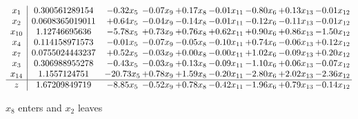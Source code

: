 \documentclass[8pt]{article}
\begin{document}
 \[\begin{array}{c| c c@{\hskip 2pt} c@{\hskip 2pt} c@{\hskip 2pt} c@{\hskip 2pt} c@{\hskip 2pt} c@{\hskip 2pt} c@{\hskip 2pt} }
 x_{1}   &  0.300561289154 & -0.32 x_{5} & -0.07 x_{9} & +  0.17 x_{8} & -0.01 x_{11} & -0.80 x_{6} & +  0.13 x_{13} & -0.01 x_{12}\\
 x_{2}   &  0.0608365019011 & +  0.64 x_{5} & -0.04 x_{9} & -0.14 x_{8} & -0.01 x_{11} & -0.12 x_{6} & -0.11 x_{13} & -0.01 x_{12}\\
 x_{10}   &  1.12746695636 & -5.78 x_{5} & +  0.73 x_{9} & +  0.76 x_{8} & +  0.62 x_{11} & +  0.90 x_{6} & +  0.86 x_{13} & -1.50 x_{12}\\
 x_{4}   &  0.114158971573 & -0.01 x_{5} & -0.07 x_{9} & -0.05 x_{8} & -0.10 x_{11} & +  0.74 x_{6} & -0.06 x_{13} & +  0.12 x_{12}\\
 x_{7}   &  0.0755024443237 & +  0.52 x_{5} & -0.03 x_{9} & +  0.00 x_{8} & -0.00 x_{11} & +  1.02 x_{6} & -0.09 x_{13} & +  0.20 x_{12}\\
 x_{3}   &  0.306988955278 & -0.43 x_{5} & -0.03 x_{9} & +  0.13 x_{8} & -0.09 x_{11} & -1.10 x_{6} & +  0.06 x_{13} & -0.07 x_{12}\\
 x_{14}   &  1.1557124751 & -20.73 x_{5} & +  0.78 x_{9} & +  1.59 x_{8} & -0.20 x_{11} & -2.80 x_{6} & +  2.02 x_{13} & -2.36 x_{12}\\
\hline
z    &  1.67209849719 & -8.85 x_{5} & -0.52 x_{9} & +  0.78 x_{8} & -0.42 x_{11} & -1.96 x_{6} & +  0.79 x_{13} & -0.14 x_{12}\\
\end{array}\]


 $ x_{8} $ enters and $ x_{2} $ leaves 
\end{document}
